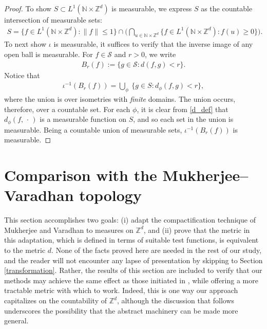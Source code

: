 \documentclass[11pt,reqno]{amsart}
\numberwithin{equation}{section}
\theoremstyle{definition}
\begin{document}
\begin{proof}
To show $S \subset L^1({\mathbb{N}} \times {\mathbb{Z}}^d)$ is measurable, we express $S$ as the countable intersection of measurable sets:
{\begin{align*} {
S = \{f \in L^1({\mathbb{N}} \times {\mathbb{Z}}^d) : \|f\| \leq 1\} \cap \bigg(\bigcap_{u \in {\mathbb{N}} \times {\mathbb{Z}}^d} \{f \in L^1({\mathbb{N}} \times {\mathbb{Z}}^d) : f(u) \geq 0\}\bigg).
} \end{align*}}
To next show $\iota$ is measurable, it suffices to verify that the inverse image of any open ball is measurable.
For $f \in {\mathcal{S}}$ and $r > 0$, we write
{\begin{align*} {
B_r(f) := \{g \in {\mathcal{S}} : d(f,g) < r\}.
} \end{align*}}
Notice that
{\begin{align*} {
\iota^{-1}(B_r(f)) = \bigcup_{\phi}\ \{g \in S : d_\phi(f,g) < r\},
} \end{align*}}
where the union is over isometries with \textit{finite} domains.
The union occurs, therefore, over a countable set.
For each $\phi$, it is clear from \eqref{d_def} that $d_\phi(f,\, \cdot\, )$ is a measurable function on $S$, and so each set in the union is measurable.
Being a countable union of measurable sets, $\iota^{-1}(B_r(f))$ is measurable.
\end{proof}

\section{Comparison with the Mukherjee--Varadhan topology} \label{compare_topologies}
This section accomplishes two goals: (i) adapt the compactification technique of Mukherjee and Varadhan \cite{mukherjee-varadhan14} to measures on ${\mathbb{Z}}^d$, and (ii) prove that the metric in this adaptation, which is defined in terms of suitable test functions, is equivalent to the metric $d$.
None of the facts proved here are needed in the rest of our study, and the reader will not encounter any lapse of presentation by skipping to Section \ref{transformation}.  
Rather, the results of this section are included to verify that our methods may achieve the same effect as those initiated in \cite{mukherjee-varadhan14}, while offering a more tractable metric with which to work.
Indeed, this is one way our approach capitalizes on the countability of ${\mathbb{Z}}^d$, although
the discussion that follows underscores the possibility that the abstract machinery can be made more general.
\end{document}
